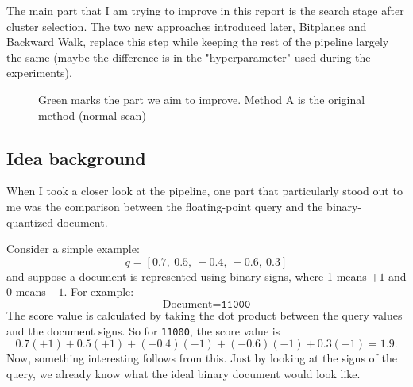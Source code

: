 The main part that I am trying to improve in this report is the search stage after cluster
selection. The two new approaches introduced later, Bitplanes and Backward Walk, replace
this step while keeping the rest of the pipeline largely the same (maybe the difference is in the "hyperparameter" used during the experiments).

\begin{figure}[H]\centering
{}
\caption{Green marks the part we aim to improve. Method A is the original method (normal scan) }
\end{figure}

\subsection{Idea background}
When I took a closer look at the pipeline, one part that particularly stood out to me was
the comparison between the floating-point query and the binary-quantized document.

Consider a simple example:
\[
q=[0.7,\ 0.5,\ -0.4,\ -0.6,\ 0.3]
\]
and suppose a document is represented using binary signs, where 1 means $+1$ and 0 means $-1$.
For example:
\[
\text{Document}=\texttt{11000}
\]
The score value is calculated by taking the dot product between the query values and the document
signs. So for \texttt{11000}, the score value is
\[
0.7(+1)+0.5(+1)+(-0.4)(-1)+(-0.6)(-1)+0.3(-1)=1.9.
\]
Now, something interesting follows from this. Just by looking at the signs of the query,
we already know what the ideal binary document would look like.

